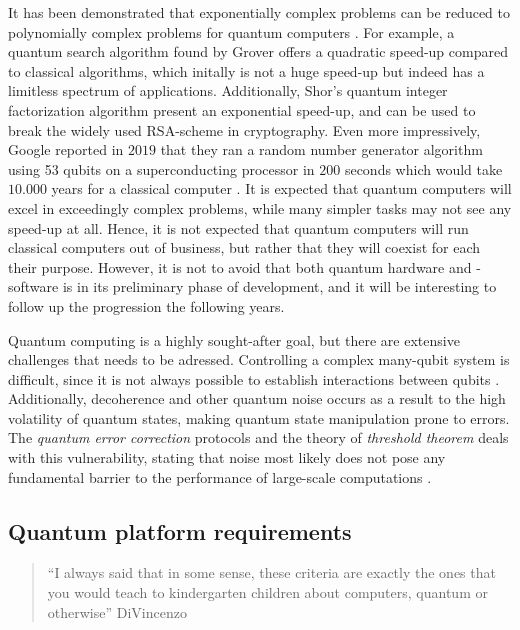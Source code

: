It has been demonstrated that exponentially complex problems can be reduced to polynomially complex problems for quantum computers \cite{Pavicic2006}. For example, a quantum search algorithm found by Grover \cite{Grover1997} offers a quadratic speed-up compared to classical algorithms, which initally is not a huge speed-up but indeed has a limitless spectrum of applications. Additionally, Shor's quantum integer factorization algorithm \cite{Shor1994} present an exponential speed-up, and can be used to break the widely used RSA-scheme in cryptography. Even more impressively, Google reported in $2019$ that they ran a random number generator algorithm using 53 qubits on a superconducting processor in $200$ seconds which would take $10.000$ years for a classical computer \cite{Martinis2019}. It is expected that quantum computers will excel in exceedingly complex problems, while many simpler tasks may not see any speed-up at all. Hence, it is not expected that quantum computers will run classical computers out of business, but rather that they will coexist for each their purpose. However, it is not to avoid that both quantum  hardware and -software is in its preliminary phase of development, and it will be interesting to follow up the progression the following years.

Quantum computing is a highly sought-after goal, but there are extensive challenges that needs to be adressed. Controlling a complex many-qubit system is difficult, since it is not always possible to establish interactions between qubits \cite{DiVincenzo2000}. Additionally, decoherence and other quantum noise occurs as a result to the high volatility of quantum states, making quantum state manipulation prone to errors. The \textit{quantum error correction} protocols and the theory of \textit{threshold theorem} deals with this vulnerability, stating that noise most likely does not pose any fundamental barrier to the performance of large-scale computations \cite{Pavicic2006}.

\subsection{Quantum platform requirements}

\begin{quote}
   ``I always said that in some sense, these criteria are exactly the ones that you would teach to kindergarten children about computers, quantum or otherwise'' DiVincenzo \cite{Georgescu2020}
\end{quote}

